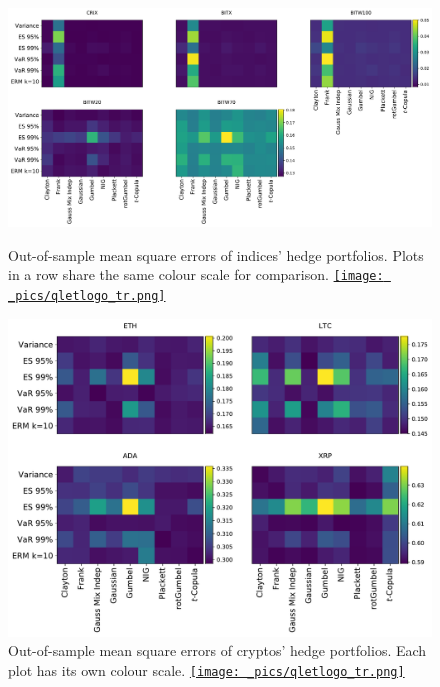 \documentclass[11pt,a4paper,english]{article}
\begin{document}
\newpage
\begin{landscape}
\begin{figure}[h]
  \begin{minipage}[t]{0.475\linewidth}
    \centering
    \includegraphics[height=.5\linewidth]{_pics/MSE_indices.pdf}
    \caption{Out-of-sample mean square errors of indices' hedge portfolios. Plots in a row share the same colour scale for comparison.
    \href{https://github.com/QuantLet/Hedging-Cryptos-with-Bitcoin-Futures/blob/main/newToQuantlet/Pynotebooks/figures/figure 6_7_8_9_10_11.ipynb}{\texttt{[image: \_pics/qletlogo\_tr.png]}}}
    \label{MSE_indices}
  \end{minipage}
  \hfill
  \begin{minipage}[t]{0.475\linewidth}
    \centering
    \includegraphics[height=.5\linewidth]{_pics/MSE_cryptos.pdf}
    \caption{Out-of-sample mean square errors of cryptos' hedge portfolios. Each plot has its own colour scale.
    \href{https://github.com/QuantLet/Hedging-Cryptos-with-Bitcoin-Futures/blob/main/newToQuantlet/Pynotebooks/figures/figure 6_7_8_9_10_11.ipynb}{\texttt{[image: \_pics/qletlogo\_tr.png]}}}\label{MSE_cryptos}
  \end{minipage}
  \begin{minipage}[b]{0.475\linewidth}

\end{minipage}
\end{figure}
\end{landscape}
\end{document}

